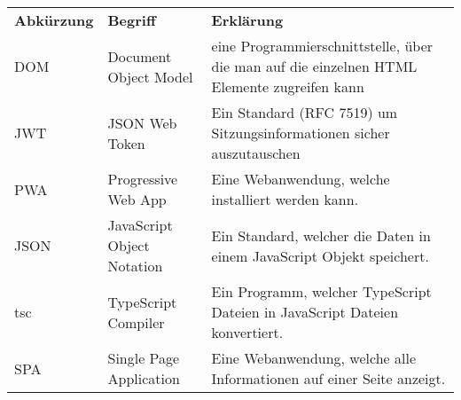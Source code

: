 
\begin{table}[H]
    \begin{tabular}{|p{}|p{}|p{}|} \hline
        \textbf{Abkürzung} & \textbf{Begriff} & \textbf{Erklärung} \\ \hhline{|=|=|=|}
        DOM & Document Object Model & eine Programmierschnittstelle, über die man auf die einzelnen HTML Elemente zugreifen kann \\ \hline
        JWT & JSON Web Token & Ein Standard (RFC 7519) um Sitzungsinformationen sicher auszutauschen \\ \hline
        PWA & Progressive Web App & Eine Webanwendung, welche installiert werden kann. \\ \hline
        JSON & JavaScript Object Notation & Ein Standard, welcher die Daten in einem JavaScript Objekt speichert. \\ \hline
        tsc & TypeScript Compiler & Ein Programm, welcher TypeScript Dateien in JavaScript Dateien konvertiert. \\ \hline
        SPA & Single Page Application & Eine Webanwendung, welche alle Informationen auf einer Seite anzeigt. \\ \hline
    \end{tabular}
\end{table}